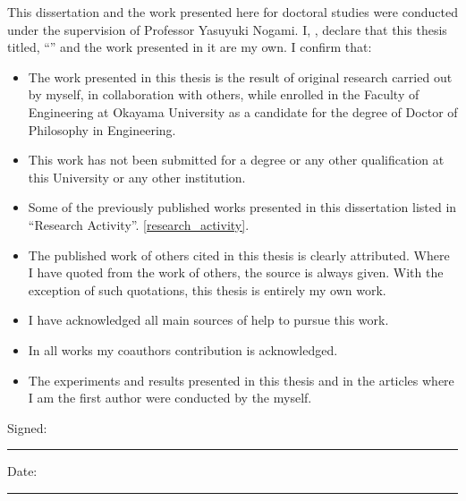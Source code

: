 \documentclass[
11pt, %
english, %
doublespacing %
liststotoc, %
toctotoc, %
parskip, %
headsepline, %
consistentlayout, %
]{MastersDoctoralThesis} %
\begin{document}

\begin{declaration}
	
\addchaptertocentry{\authorshipname} %
\noindent This dissertation and the work presented here for doctoral studies were conducted under the supervision of Professor Yasuyuki Nogami. 
 I, \authorname, declare that this thesis titled, \enquote{\ttitle} and the work presented in it are my own. I confirm that:

\begin{itemize} 
\item 
The work presented in this thesis is the result of original research carried out by myself, in collaboration with others, while enrolled in the Faculty of Engineering at Okayama University as a candidate for the degree of Doctor of Philosophy in Engineering.

\item This work has not been submitted for a degree or any other qualification at this University or any other institution. 
 
\item  Some of the previously published works presented in this dissertation listed in ``Research Activity''. \ref{research_activity}.

\item The published work of others cited in this thesis is clearly attributed.  Where I have quoted from the work of others, the source is always given. With the exception of such quotations, this thesis is entirely my own work.
\item I have acknowledged all main sources of help to pursue this work.
 \item In all works my coauthors contribution is acknowledged. 
 \item The experiments and results presented in this thesis and in the articles where I am the first author were conducted by the myself.\\
\end{itemize}
 
\noindent Signed:\\ 
\rule[0.5em]{25em}{0.5pt}
 
\noindent Date:\\
\rule[0.5em]{25em}{0.5pt} %
\end{declaration}
\end{document}
